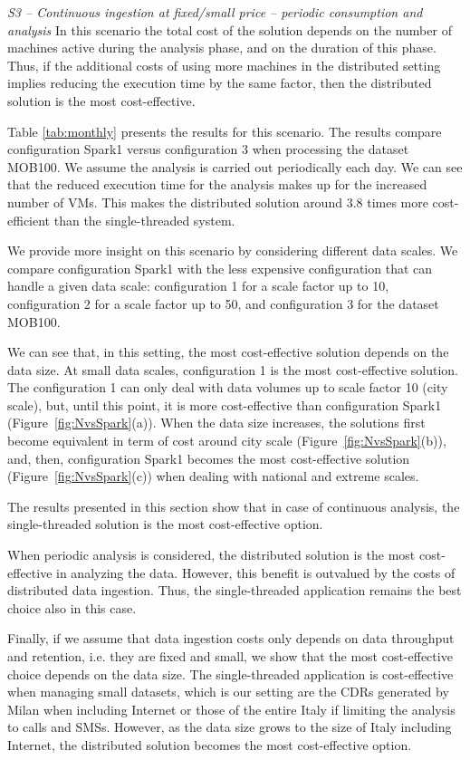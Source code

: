 {\medskip

\textit{S3 -- Continuous ingestion at fixed/small price -- periodic consumption and analysis}
In this scenario the total cost of the solution depends on the number of machines active during the analysis phase, and on the duration of this phase. Thus, if the additional costs of using more machines in the distributed setting implies reducing the execution time by the same factor, then the distributed solution is the most cost-effective.

Table \ref{tab:monthly} presents the results for this scenario. The results  compare configuration Spark1 versus configuration \sti{}3 when processing the dataset MOB100. We assume the analysis is carried out periodically each day. We can see that the reduced execution time for the analysis makes up for the increased number of VMs. This makes the distributed solution around 3.8 times more cost-efficient than the single-threaded system.

We provide more insight on this scenario by considering different data scales. We compare configuration Spark1 with the less expensive \sti{} configuration that can handle a given data scale: configuration \sti{}1 for a scale factor up to 10, configuration \sti{}2 for a scale factor up to 50, and configuration \sti{}3 for the dataset MOB100.

We can see that, in this setting, the most cost-effective solution depends on the data size. At small data scales, configuration \sti{}1 is the most cost-effective solution. The configuration \sti{}1  can only deal with data volumes up to scale factor 10 (city scale), but, until this point, it is more cost-effective than configuration Spark1 (Figure~\ref{fig:NvsSpark}(a)). When the data size increases, the solutions first become equivalent in term of cost around city scale (Figure~\ref{fig:NvsSpark}(b)), and, then, configuration Spark1 becomes the most cost-effective solution (Figure~\ref{fig:NvsSpark}(c)) when dealing with national and extreme scales.

The results presented in this section show that in case of continuous analysis, the single-threaded solution is the most cost-effective option.

When periodic analysis is considered, the distributed solution is the most cost-effective in analyzing the data. However, this benefit is outvalued by the costs of distributed data ingestion. Thus, the single-threaded application remains the best choice also in this case.

Finally, if we assume that data ingestion costs only depends on data throughput and retention, i.e. they are fixed and small, we show that the most cost-effective choice depends on the data size. The single-threaded application is cost-effective when managing small datasets, which is our setting are the CDRs generated by Milan when including Internet or those of the entire Italy if limiting the analysis to calls and SMSs. However, as the data size grows to the size of Italy including Internet, the distributed solution becomes the most cost-effective option.

}
